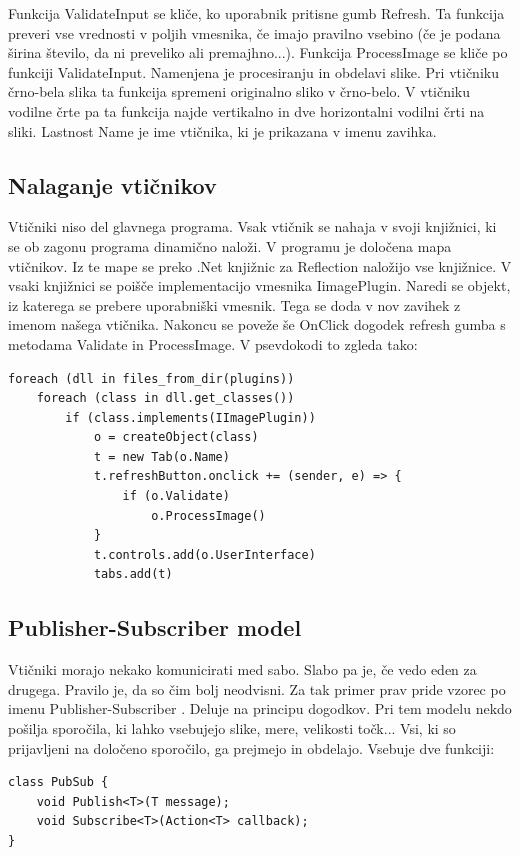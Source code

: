 \documentclass[oneside, a4paper, 12pt]{book}
\begin{document}
Funkcija ValidateInput se kliče, ko uporabnik pritisne gumb Refresh. Ta funkcija preveri vse vrednosti v poljih vmesnika, če imajo pravilno vsebino (če je podana širina število, da ni preveliko ali premajhno...). Funkcija ProcessImage se kliče po funkciji ValidateInput. Namenjena je procesiranju in obdelavi slike. Pri vtičniku črno-bela slika ta funkcija spremeni originalno sliko v črno-belo. V vtičniku vodilne črte pa ta funkcija najde vertikalno in dve horizontalni vodilni črti na sliki. Lastnost Name je ime vtičnika, ki je prikazana v imenu zavihka.

\subsection{Nalaganje vtičnikov}
Vtičniki niso del glavnega programa. Vsak vtičnik se nahaja v svoji knjižnici, ki se ob zagonu programa dinamično naloži. V programu je določena mapa vtičnikov. Iz te mape se preko .Net knjižnic za Reflection \cite{oreilly-cs} naložijo vse knjižnice. V vsaki knjižnici se poišče implementacijo vmesnika IimagePlugin. Naredi se objekt, iz katerega se prebere uporabniški vmesnik. Tega se doda v nov zavihek z imenom našega vtičnika. Nakoncu se poveže še OnClick dogodek refresh gumba s metodama Validate in ProcessImage. V psevdokodi to zgleda tako:
\begin{verbatim}
foreach (dll in files_from_dir(plugins))
    foreach (class in dll.get_classes())
        if (class.implements(IImagePlugin))
            o = createObject(class)
            t = new Tab(o.Name)
            t.refreshButton.onclick += (sender, e) => {
                if (o.Validate)
                    o.ProcessImage()
            }
            t.controls.add(o.UserInterface)
            tabs.add(t)
\end{verbatim}

\subsection{Publisher-Subscriber model}
Vtičniki morajo nekako komunicirati med sabo. Slabo pa je, če vedo eden za drugega. Pravilo je, da so čim bolj neodvisni. Za tak primer prav pride vzorec po imenu Publisher-Subscriber \cite{oreilly-cs, oreilly-dp}. Deluje na principu dogodkov. Pri tem modelu nekdo pošilja sporočila, ki lahko vsebujejo slike, mere, velikosti točk... Vsi, ki so prijavljeni na določeno sporočilo, ga prejmejo in obdelajo. Vsebuje dve funkciji:

\begin{verbatim}
class PubSub {
    void Publish<T>(T message);
    void Subscribe<T>(Action<T> callback);
}
\end{verbatim}
\end{document}

